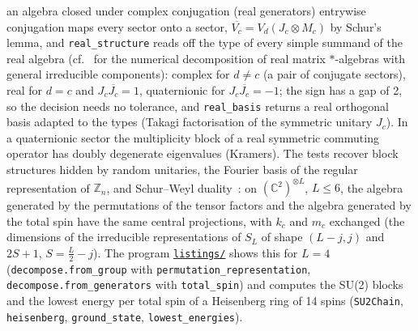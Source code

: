 \documentclass[11pt]{article}
\newcommand{\C}{\mathbb{C}}
\newcommand{\repofile}[1]{\href{https://github.com/andre-a-no/von_neumann_type_i/blob/main/man/article/listings/#1}{\texttt{listings/\allowbreak\detokenize{#1}}}}
\begin{document}
an algebra closed under complex conjugation (real generators) entrywise conjugation maps every sector onto a sector,
$\overline{V_c}=V_d(J_c\otimes M_c)$ by Schur's lemma, and \texttt{real\_structure} reads off the type of every simple
summand of the real algebra (cf.~\cite{maehara2010} for the numerical decomposition of real matrix $*$-algebras with
general irreducible components): complex for $d\neq c$ (a pair of conjugate sectors), real for $d=c$ and
$J_c\overline{J_c}=1$, quaternionic for $J_c\overline{J_c}=-1$; the sign has a gap of 2, so the decision needs no
tolerance, and \texttt{real\_basis} returns a real orthogonal basis adapted to the types (Takagi factorisation of the
symmetric unitary $J_c$). In a quaternionic sector the multiplicity block of a real symmetric commuting operator has
doubly degenerate eigenvalues (Kramers). The tests recover block structures hidden
by random unitaries, the Fourier basis of the regular representation of $\mathbb Z_n$, and Schur--Weyl
duality~\cite{fulton1991}: on $(\C^2)^{\otimes L}$, $L\le6$, the algebra generated by the permutations of the tensor
factors and the algebra generated by the total spin have the same central projections, with $k_c$ and $m_c$
exchanged (the dimensions of the irreducible representations of $S_L$ of shape $(L-j,j)$ and $2S+1$, $S=\frac L2-j$).
The program \repofile{symmetry.py} shows this for $L=4$ (\texttt{decompose.from\_group} with
\texttt{permutation\_representation}, \texttt{decompose.from\_generators} with \texttt{total\_spin}) and computes the
SU(2) blocks and the lowest energy per total spin of a Heisenberg ring of 14 spins (\texttt{SU2Chain},
\texttt{heisenberg}, \texttt{ground\_state}, \texttt{lowest\_energies}).
\end{document}
